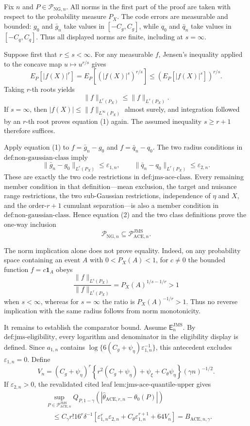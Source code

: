 Fix \(n\) and \(P\in\mathcal P_{\mathrm{NG},n}\).  All norms in the first part of the proof are taken with respect to the probability measure \(P_X\).  The code errors are measurable and bounded: \(g_0\) and \(\bar g_n\) take values in \([-C_g,C_g]\), while \(q_0\) and \(\bar q_n\) take values in \([-C_q,C_q]\).  Thus all displayed norms are finite, including at \(s=\infty\).

Suppose first that \(r\le s<\infty\).  For any measurable \(f\), Jensen's inequality applied to the concave map \(u\mapsto u^{r/s}\) gives
\[
 E_P[|f(X)|^r]
 =E_P\!\left[(|f(X)|^s)^{r/s}\right]
 \le \left(E_P[|f(X)|^s]\right)^{r/s}.
\]
Taking \(r\)-th roots yields
\[
 \|f\|_{L^r(P_X)}\le \|f\|_{L^s(P_X)}.                 \tag{1}
\]
If \(s=\infty\), then \(|f(X)|\le\|f\|_{L^\infty(P_X)}\) almost surely, and integration followed by an \(r\)-th root proves equation (1) again.  The assumed inequality \(s\ge r+1\) therefore suffices.

Apply equation (1) to \(f=\bar g_n-g_0\) and \(f=\bar q_n-q_0\).  The two radius conditions in \(\text{def:non-gaussian-class}\) imply
\[
 \|\bar g_n-g_0\|_{L^r(P_X)}\le\varepsilon_{1,n},
 \qquad
 \|\bar q_n-q_0\|_{L^r(P_X)}\le\varepsilon_{2,n}.       \tag{2}
\]
These are exactly the two code restrictions in \(\text{def:jms-ace-class}\).  Every remaining member condition in that definition---mean exclusion, the target and nuisance range restrictions, the two sub-Gaussian restrictions, independence of \(\eta\) and \(X\), and the order-\(r+1\) cumulant separation---is also a member condition in \(\text{def:non-gaussian-class}\).  Hence equation (2) and the two class definitions prove the one-way inclusion
\[
 \mathcal P_{\mathrm{NG},n}
 \subseteq \mathcal P_{\mathrm{ACE},n}^{\mathrm{JMS}}.  \tag{3}
\]

The norm implication alone does not prove equality.  Indeed, on any probability space containing an event \(A\) with \(0<P_X(A)<1\), for \(c\ne0\) the bounded function \(f=c\mathbf 1_A\) obeys
\[
 \frac{\|f\|_{L^s(P_X)}}{\|f\|_{L^r(P_X)}}
 =P_X(A)^{1/s-1/r}>1
\]
when \(s<\infty\), whereas for \(s=\infty\) the ratio is \(P_X(A)^{-1/r}>1\).  Thus no reverse implication with the same radius follows from norm monotonicity.

It remains to establish the comparator bound.  Assume \(\mathsf E_n^{\mathrm{JMS}}\).  By \(\text{def:jms-eligibility}\), every logarithm and denominator in the eligibility display is defined.  Since \(a_{1,n}\) contains \(\log\{6(C_g+\psi_\eta)\varepsilon_{1,n}^{-1}\}\), this antecedent excludes \(\varepsilon_{1,n}=0\).  Define
\[
 V_n=(C_g+\psi_\eta)^r
 \left\{r^2(C_g+\psi_\eta)+\psi_\xi+C_\theta\psi_\eta\right\}
 (\gamma n)^{-1/2}.
\]
If \(\varepsilon_{2,n}>0\), the revalidated cited leaf \(\text{lem:jms-ace-quantile-upper}\) gives
\[
 \begin{aligned}
 &\sup_{P\in\mathcal P_{\mathrm{ACE},n}^{\mathrm{JMS}}}
 Q_{P,1-\gamma}
 \!\left(|\widehat\theta_{\mathrm{ACE},r,n}-\theta_0(P)|\right)\\
 &\quad\le C_\gamma r!16^r\delta^{-1}
 \left[\varepsilon_{1,n}^r\varepsilon_{2,n}
 +C_\theta\varepsilon_{1,n}^{r+1}+64V_n\right]
 =B_{\mathrm{ACE},n,\gamma}.                            \tag{4}
 \end{aligned}
\]


